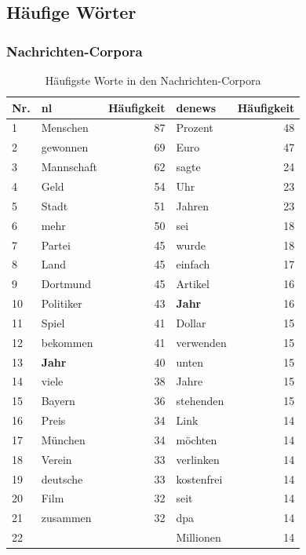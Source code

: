 \documentclass[11pt, a4paper]{article}
\begin{document}
\subsection{H\"aufige W\"orter}

\subsubsection{Nachrichten-Corpora}

\begin{table}[ht]
    \begin{tabular}{l*{2}{lr}}
    \toprule
    Nr. & nl & Häufigkeit & denews & Häufigkeit\\
    \midrule
    1  & Menschen    & 87 &  Prozent     & 48 \\
    2  & gewonnen    & 69 &  Euro        & 47 \\
    3  & Mannschaft  & 62 &  sagte       & 24 \\
    4  & Geld        & 54 &  Uhr         & 23 \\
    5  & Stadt       & 51 &  Jahren      & 23 \\
    6  & mehr        & 50 &  sei         & 18 \\
    7  & Partei      & 45 &  wurde       & 18 \\
    8  & Land        & 45 &  einfach     & 17 \\
    9  & Dortmund    & 45 &  Artikel     & 16 \\
    10 & Politiker   & 43 &  \textbf{Jahr}        & 16 \\
    11 & Spiel       & 41 &  Dollar      & 15 \\
    12 & bekommen    & 41 &  verwenden   & 15 \\
    13 & \textbf{Jahr}        & 40 &  unten       & 15 \\
    14 & viele       & 38 &  Jahre       & 15 \\
    15 & Bayern      & 36 &  stehenden   & 15 \\
    16 & Preis       & 34 &  Link        & 14 \\
    17 & München     & 34 &  möchten     & 14 \\
    18 & Verein      & 33 &  verlinken   & 14 \\
    19 & deutsche    & 33 &  kostenfrei  & 14 \\
    20 & Film        & 32 &  seit        & 14 \\
    21 & zusammen    & 32 &  dpa         & 14 \\
    22 &             &    &  Millionen   & 14 \\
    \bottomrule
    \end{tabular}
    \caption{Häufigste Worte in den Nachrichten-Corpora}
    \label{words-nachrichten}
\end{table}
\end{document}
